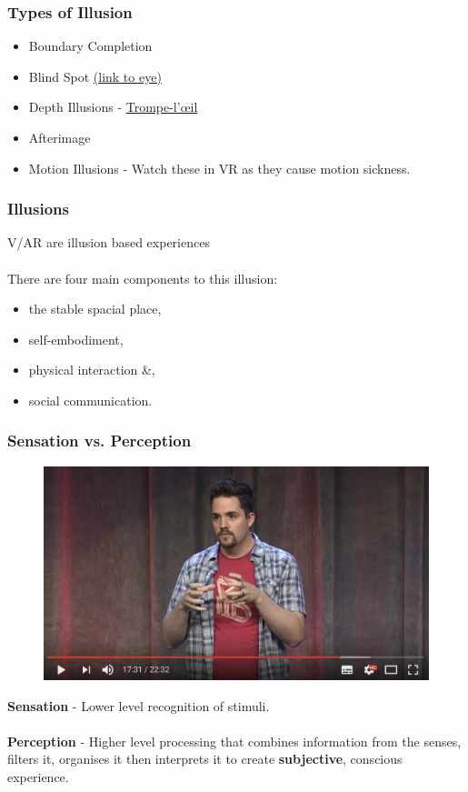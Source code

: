\begin{frame}
	\frametitle{Types of Illusion}
	\begin{itemize}
		\item Boundary Completion
		\item Blind Spot \href{http://snowbrains.com/wp-content/uploads/2013/07/eyeball.jpg}{ (link to eye)}
		\item Depth Illusions - \href{https://www.youtube.com/watch?v=QmMTwjUdqbg}{Trompe-l'\oe il}
		\item Afterimage
		\item Motion Illusions - Watch these in VR as they cause motion sickness. 
	\end{itemize}
\end{frame}

\begin{frame}
	\frametitle{Illusions}
	V/AR are illusion based experiences \\~\\ 
	
	There are four main components to this illusion:
	\begin{itemize}
		\item the stable spacial place,
		\item self-embodiment,
		\item physical interaction \&,
		\item social communication.
	\end{itemize}
\end{frame}


\begin{frame}
	\frametitle{Sensation vs. Perception}	
	\begin{figure}
		\href{https://youtu.be/Ebwtq1HZJ2A?t=1051}{ \includegraphics[scale=.17]{assets/sensation}  }
	\end{figure}
	\textbf{Sensation} - Lower level recognition of stimuli. \\~\\
	\textbf{Perception} - Higher level processing that combines information from the senses, filters it, organises it then interprets it to create \textbf{subjective}, conscious experience. 
\end{frame}


